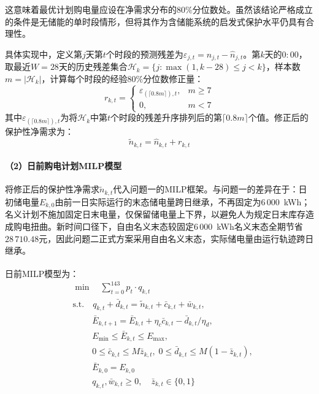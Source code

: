 \documentclass[12pt,a4paper]{ctexart}
\newcommand{\upcite}[1]{\textsuperscript{\cite{#1}}}
\theoremstyle{definition}
\theoremstyle{plain}
\theoremstyle{remark}
\begin{document}
\noindent 这意味着最优计划购电量应设在净需求分布的$80\%$分位数处。虽然该结论严格成立的条件是无储能的单时段情形，但将其作为含储能系统的启发式保护水平仍具有合理性。

具体实现中，定义第$j$天第$t$个时段的预测残差为$\varepsilon_{j,t} = n_{j,t} - \widehat{n}_{j,t}$。第$k$天的$0{:}00$，取最近$W = 28$天的历史残差集合$\mathcal{H}_k = \{j: \max(1, k-28) \leq j < k\}$，样本数$m = |\mathcal{H}_k|$，计算每个时段的经验$80\%$分位数修正量：
\begin{equation}
  r_{k,t} = \begin{cases} \varepsilon_{(\lceil 0.8m \rceil), t}, & m \geq 7 \\ 0, & m < 7 \end{cases}
  \label{eq:q2_quantile_correction}
\end{equation}
\noindent 其中$\varepsilon_{(\lceil 0.8m \rceil), t}$为将$\mathcal{H}_k$中第$t$个时段的残差升序排列后的第$\lceil 0.8m \rceil$个值。修正后的保护性净需求为：
\begin{equation}
  \widetilde{n}_{k,t} = \widehat{n}_{k,t} + r_{k,t}
  \label{eq:q2_protected_demand}
\end{equation}

\paragraph{（2）日前购电计划MILP模型}

将修正后的保护性净需求$\widetilde{n}_{k,t}$代入问题一的MILP框架。与问题一的差异在于：日初储电量$E_{k,0}$由前一日实际运行的末态储电量跨日继承，不再固定为$6\,000$~kWh；名义计划不施加固定日末电量，仅保留储电量上下界，以避免人为规定日末库存造成购电扭曲。新时间口径下，自由名义末态较固定$6\,000$~kWh名义末态全期节省$28\,710.48$元，因此问题二正式方案采用自由名义末态，实际储电量由运行轨迹跨日继承。

日前MILP模型\upcite{silva2020dayahead}为：
\begin{equation}
\begin{aligned}
  & \boxed{\min \quad \sum_{t=0}^{143} p_t \cdot q_{k,t}} \\
  & \text{s.t.} \quad q_{k,t} + \bar{d}_{k,t} = \widetilde{n}_{k,t} + \bar{c}_{k,t} + \bar{w}_{k,t}, \\
  & \quad\quad\; \bar{E}_{k,t+1} = \bar{E}_{k,t} + \eta_c \bar{c}_{k,t} - \bar{d}_{k,t}/\eta_d, \\
  & \quad\quad\; E_{\min} \leq \bar{E}_{k,t} \leq E_{\max}, \\
  & \quad\quad\; 0 \leq \bar{c}_{k,t} \leq M \bar{z}_{k,t}, \; 0 \leq \bar{d}_{k,t} \leq M(1-\bar{z}_{k,t}), \\
  & \quad\quad\; \bar{E}_{k,0} = E_{k,0} \\
  & \quad\quad\; q_{k,t}, \bar{w}_{k,t} \geq 0, \quad \bar{z}_{k,t} \in \{0,1\}
\end{aligned}
\label{eq:q2_milp}
\end{equation}
\end{document}
